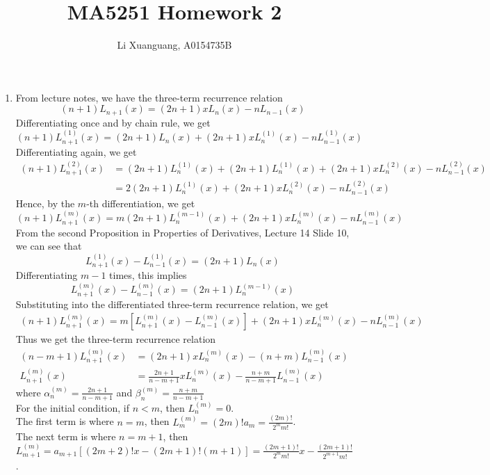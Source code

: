 \documentclass[a4paper,8pt]{article}
\title{MA5251 Homework 2}
\author{Li Xuanguang, A0154735B}
\begin{document}
\maketitle

\begin{enumerate}[label=Q\arabic	*.]
\setlength{\itemsep}{0pt}
\setcounter{enumi}{0}
\item
From lecture notes, we have the three-term recurrence relation
\begin{equation}
(n+1)L_{n+1}(x) = (2n+1)x L_n(x) - nL_{n-1}(x) \nonumber
\end{equation}
Differentiating once and by chain rule, we get
\begin{equation}
(n+1)L^{(1)}_{n+1}(x) = (2n+1) L_n(x) + (2n+1)x L^{(1)}_n(x) - nL^{(1)}_{n-1} (x) \nonumber
\end{equation}
Differentiating again, we get
\begin{align}
(n+1)L^{(2)}_{n+1}(x) &= (2n+1)L^{(1)}_n(x) + (2n+1)L^{(1)}_n(x) + (2n+1)x L^{(2)}_n(x) - nL^{(2)}_{n-1} (x) \nonumber \\
&= 2(2n+1)L^{(1)}_n(x) + (2n+1)x L^{(2)}_n(x) - nL^{(2)}_{n-1} (x) \nonumber
\end{align}
Hence, by the $m$-th differentiation, we get
\begin{equation}
(n+1)L^{(m)}_{n+1}(x) = m(2n+1)L^{(m-1)}_n(x) + (2n+1)x L^{(m)}_n(x) - nL^{(m)}_{n-1} (x) \nonumber
\end{equation}
From the second Proposition in Properties of Derivatives, Lecture 14 Slide 10, we can see that
\begin{equation}
L^{(1)}_{n+1}(x) - L^{(1)}_{n-1}(x) = (2n+1)L_{n}(x) \nonumber
\end{equation}
Differentiating $m-1$ times, this implies
\begin{equation}
L^{(m)}_{n+1}(x) - L^{(m)}_{n-1}(x) = (2n+1)L^{(m-1)}_{n}(x) \nonumber
\end{equation}
Substituting into the differentiated three-term recurrence relation, we get
\begin{align}
(n+1)L^{(m)}_{n+1}(x) = m[L^{(m)}_{n+1}(x) - L^{(m)}_{n-1}(x)] + (2n+1)x L^{(m)}_n(x) - nL^{(m)}_{n-1} (x)  \nonumber
\end{align}
Thus we get the three-term recurrence relation
\begin{align}
(n-m+1)L^{(m)}_{n+1}(x) &= (2n+1)x L^{(m)}_n(x) - (n+m)L^{(m)}_{n-1} (x)  \nonumber \\
L^{(m)}_{n+1}(x) &= \frac{2n+1}{n-m+1}x L^{(m)}_n(x) - \frac{n+m}{n-m+1}L^{(m)}_{n-1} (x) \nonumber
\end{align}
where $\alpha^{(m)}_n = \frac{2n+1}{n-m+1}$ and $\beta^{(m)}_n = \frac{n+m}{n-m+1}$ \\
For the initial condition, if $n < m$, then $L^{(m)}_n = 0$.\\
The first term is where $n=m$, then $L^{(m)}_m = (2m)!a_m = \frac{(2m)!}{2^m m!}$.\\
The next term is where $n = m+1$, then $L^{(m)}_{m+1} = a_{m+1}[(2m+2)!x - (2m+1)!(m+1)] = \frac{(2m+1)!}{2^m m!}x - \frac{(2m+1)!}{2^{m+1} m!}$.
\end{enumerate}
\end{document}
